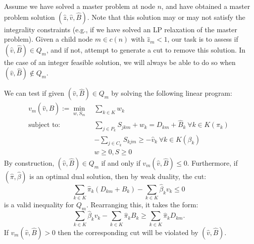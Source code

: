 \documentclass[10pt]{article}
\newcommand{\ka}{k} %
\newcommand{\KA}{K}
\newcommand{\Bi}{B} %
\newcommand{\Vi}{v} %
\newcommand{\Es}{S} %
\newcommand{\Zed}{z} %
\begin{document}
\newcommand{\vsol}{\hat{\Vi}}
\newcommand{\zsol}{\hat{\Zed}}
\newcommand{\bsol}{\hat{\Bi}}
\newcommand{\pisol}{\hat{\pi}}
\newcommand{\betasol}{\hat{\beta}}

Assume we have solved a master problem at node $n$, and have obtained a master problem solution $(\zsol,\vsol,\bsol)$. Note that this solution may or may not satisfy the integrality constraints (e.g., if we have solved an LP relaxation of the master problem). Given a child node $m \in c(n)$ with $\zsol_m < 1$, our task is to assess if $(\vsol,\bsol) \in Q_m$, and if not, attempt to generate a cut to remove this solution. In the case of an integer feasible solution, we will always be able to do so when $(\vsol,\bsol) \notin Q_m$.

We can test if given $(\vsol,\bsol) \in Q_m$ by solving the following linear program:
\begin{align*}
\Vi_m(\vsol,\bsol) :=  \min_{w,\Es_m} \ & \sum_{\ka  \in \KA} w_k \\
    \text{subject to: } & \sum_{j \in P_k} \Es_{jkm} + w_k = D_{km} + \bsol_k \ \forall \ka  \in \KA (\pi_k) \\
    &-\sum_{j \in C_k} \Es_{\ka jm} \geq -\vsol_k \ \forall \ka  \in \KA (\beta_k) \\
    & w \geq 0, S \geq 0
\end{align*}
By construction, $(\vsol,\bsol) \in Q_m$ if and only if $\Vi_m(\vsol,\bsol) \leq 0$. Furthermore, if $(\pisol,\betasol)$ is an optimal dual solution, then by weak duality, the cut:
 \[ \sum_{\ka  \in \KA} \pisol_k (D_{km} + \Bi_k) - \sum_{\ka  \in \KA} \betasol_k \Vi_k \leq 0 \]
is a valid inequality for $Q_m$. Rearranging this, it takes the form:
\[ \sum_{\ka  \in \KA} \betasol_k \Vi_k - \sum_{\ka  \in \KA} \pisol_k \Bi_k  \geq  \sum_{\ka  \in \KA} \pisol_k D_{km}. \]
If $\Vi_m(\vsol,\bsol) > 0$ then the corresponding cut will be violated by $(\vsol,\bsol)$. 
\end{document}
